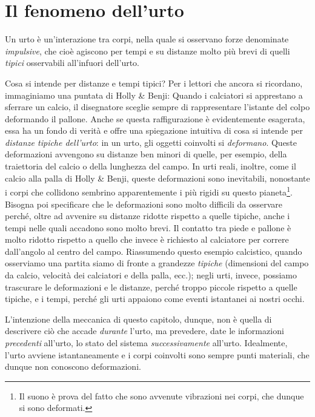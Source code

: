\section{Il fenomeno dell'urto}

\begin{tcolorbox}[colback = yellow!30, colframe = yellow!30!black, title = {Urto}]
    Un urto è un'interazione tra corpi, nella quale si osservano forze
    denominate \textit{impulsive}, che cioè agiscono per tempi e su distanze
    molto più brevi di quelli \textit{tipici} osservabili all'infuori
    dell'urto.
\end{tcolorbox}
\vspace{5pt}

Cosa si intende per distanze e tempi tipici? Per i lettori che ancora si
ricordano, immaginiamo una puntata di Holly \& Benji: Quando i calciatori
si apprestano a sferrare un calcio, il disegnatore sceglie sempre
di rappresentare l'istante del colpo deformando il pallone. Anche se questa
raffigurazione è evidentemente esagerata, essa ha un fondo di verità e offre una spiegazione
intuitiva di cosa si intende per \textit{distanze tipiche dell'urto}: in un
urto, gli oggetti coinvolti si \textit{deformano}. Queste deformazioni avvengono
su distanze ben minori di quelle, per esempio, della traiettoria del calcio o
della lunghezza del campo. In urti reali, inoltre,
come il calcio alla palla di Holly \& Benji, queste deformazioni sono inevitabili,
nonostante i corpi che collidono sembrino apparentemente i più rigidi su
questo pianeta\footnote{Il suono è prova del fatto che sono avvenute vibrazioni
nei corpi, che dunque si sono deformati.}. Bisogna poi specificare che le
deformazioni sono molto difficili da osservare perché, oltre ad avvenire su
distanze ridotte rispetto a quelle tipiche, anche i tempi nelle quali accadono
sono molto brevi. Il contatto tra piede e pallone è molto ridotto rispetto a
quello che invece è richiesto al calciatore per correre dall'angolo al centro
del campo. Riassumendo questo esempio calcistico, quando osserviamo una
partita siamo di fronte a grandezze \textit{tipiche} (dimensioni del campo da
calcio, velocità dei calciatori e della palla, ecc.); negli urti, invece,
possiamo trascurare le deformazioni e le distanze, perché troppo piccole
rispetto a quelle tipiche, e i tempi, perché gli urti appaiono come eventi
istantanei ai nostri occhi.

L'intenzione della meccanica di questo capitolo, dunque, non è quella di
descrivere ciò che accade \textit{durante} l'urto, ma prevedere, date le
informazioni \textit{precedenti} all'urto, lo stato del sistema
\textit{successivamente} all'urto. Idealmente, l'urto avviene istantaneamente
e i corpi coinvolti sono sempre punti materiali, che dunque non conoscono
deformazioni.

